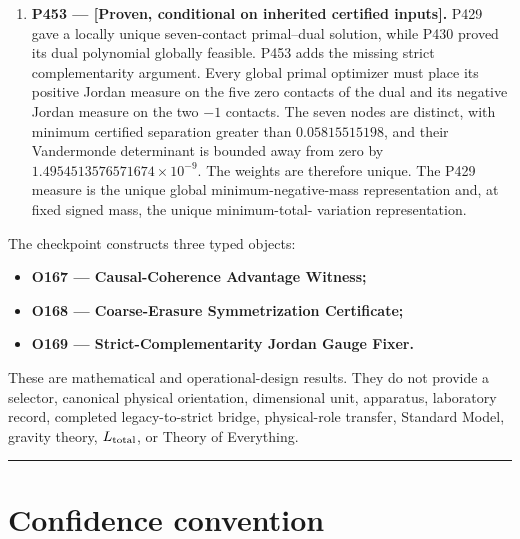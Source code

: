 \documentclass[11pt,a4paper,openany]{report}
\begin{document}
\begin{enumerate}
\[
   0.46327828319203235
   \le D_{\rm coarse}^{\max}
   \le 0.4642707484333634,
   \]

with gap \(0.0009924652413310642<10^{-3}\). This improves the P448 global upper bound by \(0.0023597549471144896\).

\item 
\textbf{P453 --- [Proven, conditional on inherited certified inputs].} P429 gave a locally unique seven-contact primal--dual solution, while P430 proved its dual polynomial globally feasible. P453 adds the missing strict complementarity argument. Every global primal optimizer must place its positive Jordan measure on the five zero contacts of the dual and its negative Jordan measure on the two \(-1\) contacts. The seven nodes are distinct, with minimum certified separation greater than \(0.05815515198\), and their Vandermonde determinant is bounded away from zero by \(1.4954513576571674\times10^{-9}\). The weights are therefore unique. The P429 measure is the unique global minimum-negative-mass representation and, at fixed signed mass, the unique minimum-total- variation representation.

\end{enumerate}

The checkpoint constructs three typed objects:

\begin{itemize}
\item 
\textbf{O167 --- Causal-Coherence Advantage Witness;}

\item 
\textbf{O168 --- Coarse-Erasure Symmetrization Certificate;}

\item 
\textbf{O169 --- Strict-Complementarity Jordan Gauge Fixer.}

\end{itemize}

These are mathematical and operational-design results. They do not provide a selector, canonical physical orientation, dimensional unit, apparatus, laboratory record, completed legacy-to-strict bridge, physical-role transfer, Standard Model, gravity theory, \(L_{\rm total}\), or Theory of Everything.

\par\medskip\hrule\medskip

\chapter{Confidence convention}
\end{document}
